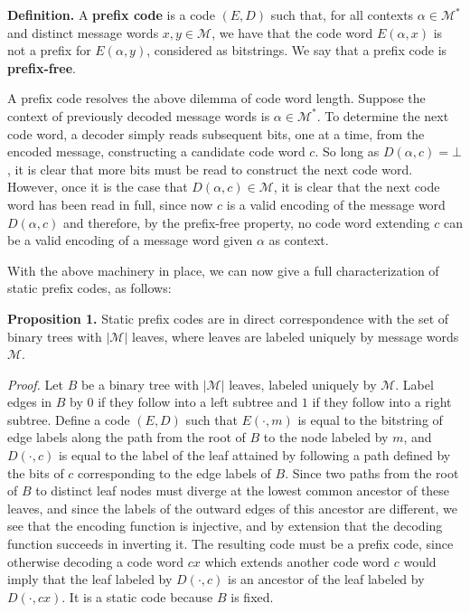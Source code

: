 \documentclass[twoside]{article}
\begin{document}
\begin{multicols}{2}
\vspace{0.5em}
\textbf{Definition. } A \textbf{prefix code} is a code $(E, D)$ such that, for all contexts $\alpha \in \mathcal{M}^*$ and distinct message words $x, y \in \mathcal{M}$, we have that the code word $E(\alpha, x)$ is not a prefix for $E(\alpha, y)$, considered as bitstrings. We say that a prefix code is \textbf{prefix-free}.

\vspace{0.5em}
A prefix code resolves the above dilemma of code word length. Suppose the context of previously decoded message words is $\alpha \in \mathcal{M}^*$. To determine the next code word, a decoder simply reads subsequent bits, one at a time, from the encoded message, constructing a candidate code word $c$. So long as $D(\alpha, c) = \bot$, it is clear that more bits must be read to construct the next code word. However, once it is the case that $D(\alpha, c) \in \mathcal{M}$, it is clear that the next code word has been read in full, since now $c$ is a valid encoding of the message word $D(\alpha, c)$ and therefore, by the prefix-free property, no code word extending $c$ can be a valid encoding of a message word given $\alpha$ as context.

With the above machinery in place, we can now give a full characterization of static prefix codes, as follows:

\vspace{0.5em}
\noindent \textbf{Proposition 1. } Static prefix codes are in direct correspondence with the set of binary trees with $|\mathcal{M}|$ leaves, where leaves are labeled uniquely by message words $\mathcal{M}$.

\vspace{0.5em}
\textit{Proof. } Let $B$ be a binary tree with $|\mathcal{M}|$ leaves, labeled uniquely by $\mathcal{M}$. Label edges in $B$ by $0$ if they follow into a left subtree and $1$ if they follow into a right subtree. Define a code $(E, D)$ such that $E(\cdot, m)$ is equal to the bitstring of edge labels along the path from the root of $B$ to the node labeled by $m$, and $D(\cdot, c)$ is equal to the label of the leaf attained by following a path defined by the bits of $c$ corresponding to the edge labels of $B$. Since two paths from the root of $B$ to distinct leaf nodes must diverge at the lowest common ancestor of these leaves, and since the labels of the outward edges of this ancestor are different, we see that the encoding function is injective, and by extension that the decoding function succeeds in inverting it. The resulting code must be a prefix code, since otherwise decoding a code word $cx$ which extends another code word $c$ would imply that the leaf labeled by $D(\cdot, c)$ is an ancestor of the leaf labeled by $D(\cdot, cx)$. It is a static code because $B$ is fixed.


\end{multicols}
\end{document}
